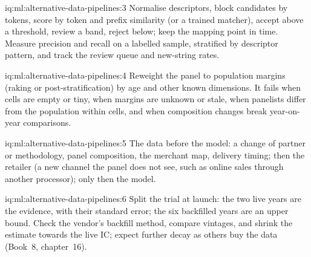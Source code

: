 \begin{solution}{iq:ml:alternative-data-pipelines:3}
Normalise descriptors, block candidates by tokens, score by token and prefix similarity (or a trained matcher), accept
above a threshold, review a band, reject below; keep the mapping point in time. Measure precision and recall on a labelled
sample, stratified by descriptor pattern, and track the review queue and new-string rates.
\end{solution}

\begin{solution}{iq:ml:alternative-data-pipelines:4}
Reweight the panel to population margins (raking or post-stratification) by age and other known dimensions. It fails when
cells are empty or tiny, when margins are unknown or stale, when panelists differ from the population within cells, and
when composition changes break year-on-year comparisons.
\end{solution}

\begin{solution}{iq:ml:alternative-data-pipelines:5}
The data before the model: a change of partner or methodology, panel composition, the merchant map, delivery timing; then
the retailer (a new channel the panel does not see, such as online sales through another processor); only then the model.
\end{solution}

\begin{solution}{iq:ml:alternative-data-pipelines:6}
Split the trial at launch: the two live years are the evidence, with their standard error; the six backfilled years are an
upper bound. Check the vendor's backfill method, compare vintages, and shrink the estimate towards the live IC; expect further
decay as others buy the data (Book~8, chapter~16).
\end{solution}
